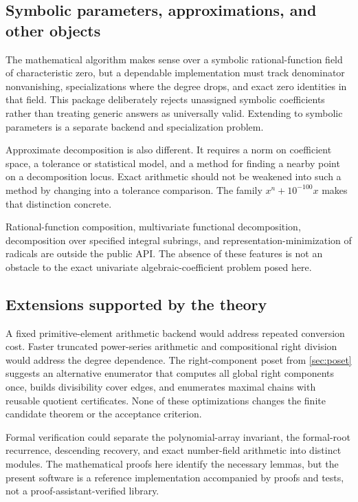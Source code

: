 \documentclass[11pt,a4paper]{article}
\theoremstyle{definition}
\newcommand{\code}[1]{\texttt{\detokenize{#1}}}
\begin{document}
\subsection{Symbolic parameters, approximations, and other objects}
The mathematical algorithm makes sense over a symbolic rational-function field of characteristic zero, but a dependable implementation must track denominator nonvanishing, specializations where the degree drops, and exact zero identities in that field. This package deliberately rejects unassigned symbolic coefficients rather than treating generic answers as universally valid. Extending to symbolic parameters is a separate backend and specialization problem.

Approximate decomposition is also different. It requires a norm on coefficient space, a tolerance or statistical model, and a method for finding a nearby point on a decomposition locus. Exact arithmetic should not be weakened into such a method by changing \code{SameQ[coefficient,0]} into a tolerance comparison. The family $x^n+10^{-100}x$ makes that distinction concrete.

Rational-function composition, multivariate functional decomposition, decomposition over specified integral subrings, and representation-minimization of radicals are outside the public API. The absence of these features is not an obstacle to the exact univariate algebraic-coefficient problem posed here.

\subsection{Extensions supported by the theory}
A fixed primitive-element arithmetic backend would address repeated conversion cost. Faster truncated power-series arithmetic and compositional right division would address the degree dependence. The right-component poset from \cref{sec:poset} suggests an alternative enumerator that computes all global right components once, builds divisibility cover edges, and enumerates maximal chains with reusable quotient certificates. None of these optimizations changes the finite candidate theorem or the acceptance criterion.

Formal verification could separate the polynomial-array invariant, the formal-root recurrence, descending recovery, and exact number-field arithmetic into distinct modules. The mathematical proofs here identify the necessary lemmas, but the present software is a reference implementation accompanied by proofs and tests, not a proof-assistant-verified library.
\end{document}
